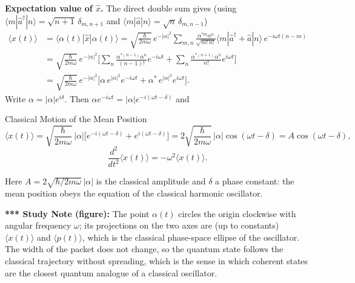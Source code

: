 \documentclass[11pt,a4paper]{article}
\begin{document}
\textbf{Expectation value of $\hat x$.} The direct double sum gives (using $\langle m|\hat a^\dagger|n\rangle=\sqrt{n+1}\,\delta_{m,n+1}$ and $\langle m|\hat a|n\rangle=\sqrt n\,\delta_{m,n-1}$)
\begin{align*}
\langle x(t)\rangle&=\langle\alpha(t)|\hat x|\alpha(t)\rangle
=\sqrt{\frac\hbar{2m\omega}}\,e^{-|\alpha|^2}\sum_{m,n}\frac{\alpha^{*m}\alpha^n}{\sqrt{m!\,n!}}\langle m|\hat a^\dagger+\hat a|n\rangle\,e^{-i\omega t(n-m)}\\
&=\sqrt{\frac\hbar{2m\omega}}\,e^{-|\alpha|^2}\Big[\sum_n\frac{\alpha^{*(n-1)}\alpha^n}{(n-1)!}e^{-i\omega t}+\sum_n\frac{\alpha^{*(n+1)}\alpha^n}{n!}e^{i\omega t}\Big]\\
&=\sqrt{\frac\hbar{2m\omega}}\,e^{-|\alpha|^2}\Big[\alpha\,e^{|\alpha|^2}e^{-i\omega t}+\alpha^*\,e^{|\alpha|^2}e^{i\omega t}\Big].
\end{align*}
Write $\alpha=|\alpha|e^{i\delta}$. Then $\alpha e^{-i\omega t}=|\alpha|e^{-i(\omega t-\delta)}$ and
\begin{thm}{Classical Motion of the Mean Position}
\[
\langle x(t)\rangle=\sqrt{\frac\hbar{2m\omega}}\,|\alpha|\Big[e^{-i(\omega t-\delta)}+e^{i(\omega t-\delta)}\Big]=2\sqrt{\frac\hbar{2m\omega}}\,|\alpha|\cos(\omega t-\delta)=A\cos(\omega t-\delta),
\]
\[
\frac{d^2}{dt^2}\langle x(t)\rangle=-\omega^2\langle x(t)\rangle .
\]
\end{thm}
Here $A=2\sqrt{\hbar/2m\omega}\,|\alpha|$ is the classical amplitude and $\delta$ a phase constant: the mean position obeys the equation of the classical harmonic oscillator.

\begin{center}
\end{center}
\textbf{*** Study Note (figure):} The point $\alpha(t)$ circles the origin clockwise with angular frequency $\omega$; its projections on the two axes are (up to constants) $\langle x(t)\rangle$ and $\langle p(t)\rangle$, which is the classical phase-space ellipse of the oscillator. The width of the packet does not change, so the quantum state follows the classical trajectory without spreading, which is the sense in which coherent states are the closest quantum analogue of a classical oscillator.
\end{document}
